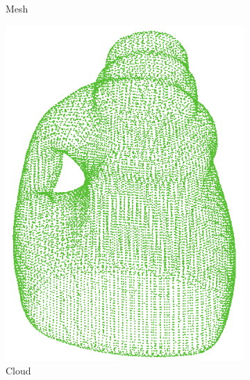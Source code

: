\begin{figure}
\begin{subfigure}{0.3\linewidth}
    \caption{Mesh}
    \label{fig:objrecog:meshcloudgrid:mesh}
  \end{subfigure}
  \begin{subfigure}{0.3\linewidth}
    \centering
    \includegraphics[width=\linewidth]{Figures/ObjRecog/cloud.png}
    \caption{Cloud}
    \label{fig:objrecog:meshcloudgrid:cloud}
  \end{subfigure}
  \begin{subfigure}{0.3\linewidth}
    \centering

\end{subfigure}
\end{figure}
